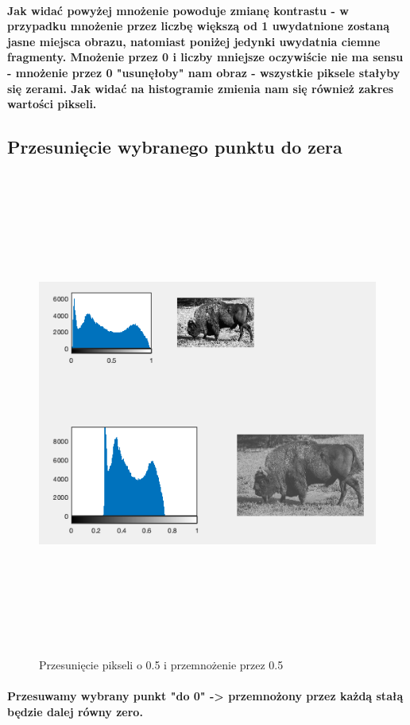 \documentclass[a4paper,12pt]{article}
\begin{document}
\begin{justify}
\paragraph{Jak widać powyżej mnożenie powoduje zmianę kontrastu - w przypadku mnożenie przez liczbę większą od 1 uwydatnione zostaną jasne miejsca obrazu, natomiast poniżej jedynki uwydatnia ciemne fragmenty. Mnożenie przez 0 i liczby mniejsze oczywiście nie ma sensu - mnożenie przez 0 "usunęłoby" nam obraz - wszystkie piksele stałyby się zerami. Jak widać na histogramie zmienia nam się również zakres wartości pikseli. }

\subsection{Przesunięcie wybranego punktu do zera}

\begin{figure}[h]
\centering
\includegraphics[width=18cm, height=16cm]{3}
\caption{Przesunięcie pikseli o 0.5 i przemnożenie przez 0.5}
\end{figure}

\paragraph{Przesuwamy wybrany punkt "do 0" -> przemnożony przez każdą stałą będzie dalej równy zero. }


\end{justify}
\end{document}
